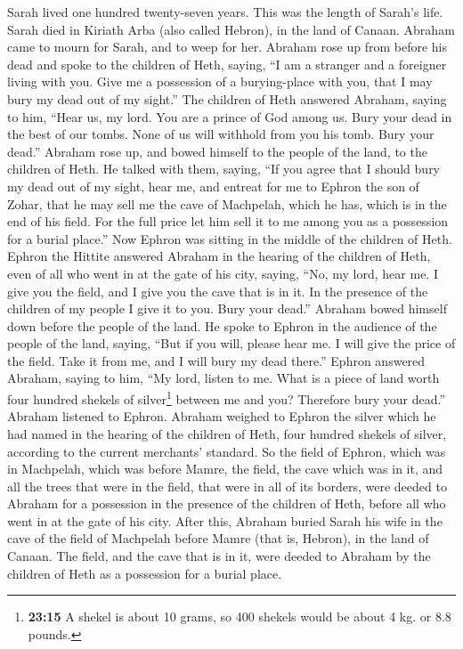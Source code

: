  Sarah lived one hundred twenty-seven years. This was the
length of Sarah's life.  Sarah died in Kiriath Arba (also
called Hebron), in the land of Canaan. Abraham came to mourn for Sarah,
and to weep for her.  Abraham rose up from before his dead
and spoke to the children of Heth, saying,  ``I am a
stranger and a foreigner living with you. Give me a possession of a
burying-place with you, that I may bury my dead out of my sight.''
 The children of Heth answered Abraham, saying to him,
 ``Hear us, my lord. You are a prince of God among us.
Bury your dead in the best of our tombs. None of us will withhold from
you his tomb. Bury your dead.''  Abraham rose up, and
bowed himself to the people of the land, to the children of Heth.
 He talked with them, saying, ``If you agree that I should
bury my dead out of my sight, hear me, and entreat for me to Ephron the
son of Zohar,  that he may sell me the cave of Machpelah,
which he has, which is in the end of his field. For the full price let
him sell it to me among you as a possession for a burial place.''
 Now Ephron was sitting in the middle of the children of
Heth. Ephron the Hittite answered Abraham in the hearing of the children
of Heth, even of all who went in at the gate of his city, saying,
 ``No, my lord, hear me. I give you the field, and I give
you the cave that is in it. In the presence of the children of my people
I give it to you. Bury your dead.''  Abraham bowed
himself down before the people of the land.  He spoke to
Ephron in the audience of the people of the land, saying, ``But if you
will, please hear me. I will give the price of the field. Take it from
me, and I will bury my dead there.''  Ephron answered
Abraham, saying to him,  ``My lord, listen to me. What is
a piece of land worth four hundred shekels of silver\footnote{\textbf{23:15}
  A shekel is about 10 grams, so 400 shekels would be about 4 kg. or 8.8
  pounds.} between me and you? Therefore bury your dead.''
 Abraham listened to Ephron. Abraham weighed to Ephron
the silver which he had named in the hearing of the children of Heth,
four hundred shekels of silver, according to the current merchants'
standard.  So the field of Ephron, which was in
Machpelah, which was before Mamre, the field, the cave which was in it,
and all the trees that were in the field, that were in all of its
borders, were deeded  to Abraham for a possession in the
presence of the children of Heth, before all who went in at the gate of
his city.  After this, Abraham buried Sarah his wife in
the cave of the field of Machpelah before Mamre (that is, Hebron), in
the land of Canaan.  The field, and the cave that is in
it, were deeded to Abraham by the children of Heth as a possession for a
burial place.

